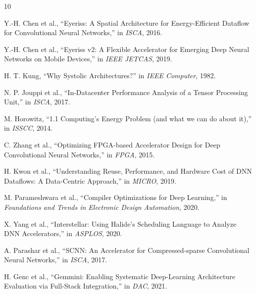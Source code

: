 \documentclass[conference]{IEEEtran}
\begin{document}
\begin{thebibliography}{10}

Y.-H. Chen et al., ``Eyeriss: A Spatial Architecture for Energy-Efficient Dataflow for Convolutional Neural Networks,'' in \textit{ISCA}, 2016.

Y.-H. Chen et al., ``Eyeriss v2: A Flexible Accelerator for Emerging Deep Neural Networks on Mobile Devices,'' in \textit{IEEE JETCAS}, 2019.

H. T. Kung, ``Why Systolic Architectures?'' in \textit{IEEE Computer}, 1982.

N. P. Jouppi et al., ``In-Datacenter Performance Analysis of a Tensor Processing Unit,'' in \textit{ISCA}, 2017.

M. Horowitz, ``1.1 Computing's Energy Problem (and what we can do about it),'' in \textit{ISSCC}, 2014.

C. Zhang et al., ``Optimizing FPGA-based Accelerator Design for Deep Convolutional Neural Networks,'' in \textit{FPGA}, 2015.

H. Kwon et al., ``Understanding Reuse, Performance, and Hardware Cost of DNN Dataflows: A Data-Centric Approach,'' in \textit{MICRO}, 2019.

M. Parameshwara et al., ``Compiler Optimizations for Deep Learning,'' in \textit{Foundations and Trends in Electronic Design Automation}, 2020.

X. Yang et al., ``Interstellar: Using Halide's Scheduling Language to Analyze DNN Accelerators,'' in \textit{ASPLOS}, 2020.

A. Parashar et al., ``SCNN: An Accelerator for Compressed-sparse Convolutional Neural Networks,'' in \textit{ISCA}, 2017.

H. Genc et al., ``Gemmini: Enabling Systematic Deep-Learning Architecture Evaluation via Full-Stack Integration,'' in \textit{DAC}, 2021.

\end{thebibliography}
\end{document}
